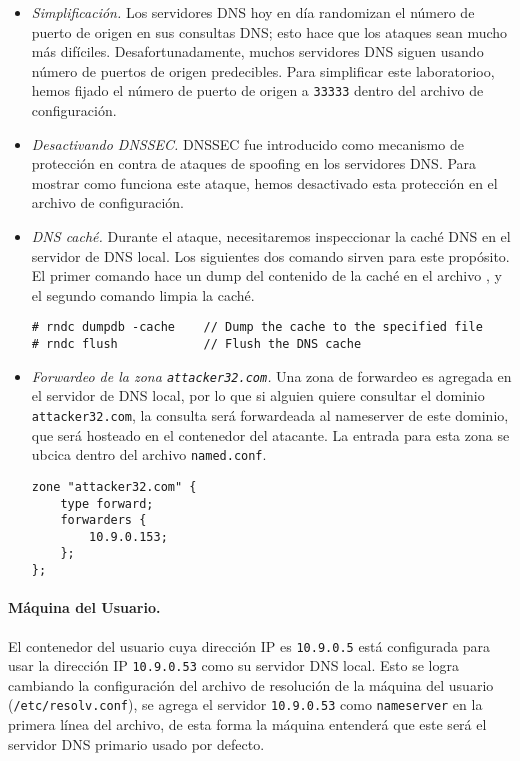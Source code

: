 \begin{itemize}
\item \textit{Simplificación.}
Los servidores DNS hoy en día randomizan el número de puerto de origen en sus consultas DNS; esto hace que los ataques sean mucho más difíciles. Desafortunadamente, muchos servidores DNS siguen usando número de puertos de origen predecibles. Para simplificar este laboratorioo, hemos fijado el número de puerto de origen a {\tt 33333} dentro del archivo de configuración.

\item \textit{Desactivando DNSSEC.} 
DNSSEC fue introducido como mecanismo de protección en contra de ataques de spoofing en los servidores DNS. Para mostrar como funciona este ataque, hemos desactivado esta protección en el archivo de configuración.

\item \textit{DNS caché.}
Durante el ataque, necesitaremos inspeccionar la caché DNS en el servidor de DNS local. Los siguientes dos comando sirven para este propósito.
El primer comando hace un dump del contenido de la caché en el archivo , y el segundo comando limpia la caché.

\begin{lstlisting}
# rndc dumpdb -cache    // Dump the cache to the specified file
# rndc flush            // Flush the DNS cache
\end{lstlisting}

\item \textit{Forwardeo de la zona \texttt{attacker32.com}.}
Una zona de forwardeo es agregada en el servidor de DNS local, por lo que si alguien quiere consultar el dominio \texttt{attacker32.com}, la consulta será forwardeada al nameserver de este dominio, que será hosteado en el contenedor del atacante. La entrada para esta zona se ubcica dentro del archivo \texttt{named.conf}.

\begin{lstlisting}
zone "attacker32.com" {
    type forward;
    forwarders { 
        10.9.0.153; 
    };
};
\end{lstlisting}
\end{itemize}



\paragraph{Máquina del Usuario.}
El contenedor del usuario cuya dirección IP es {\tt 10.9.0.5} está configurada para usar la dirección IP {\tt 10.9.0.53} como su servidor DNS local.
Esto se logra cambiando la configuración del archivo de resolución de la máquina del usuario (\texttt{/etc/resolv.conf}), se agrega el servidor \texttt{10.9.0.53}  como \texttt{nameserver} en la primera línea del archivo, de esta forma la máquina entenderá que este será el servidor DNS primario usado por defecto.


